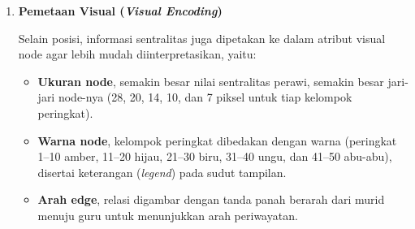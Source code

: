\begin{enumerate}
\begin{enumerate}
\item \textbf{Gaya tolak (\textit{repulsion})}, bekerja antar pasangan \textit{node} dan hanya diterapkan jika jarak antar \textit{node} kurang dari 320 piksel:
\begin{equation}
F_{tolak} = \frac{k_r}{d^2}, \quad k_r = 2000
\label{eq:gaya-tolak}
\end{equation}
dengan $d$ adalah jarak Euclidean antara dua \textit{node}.

\item \textbf{Gaya pegas (\textit{spring})}, bekerja pada setiap \textit{edge} dengan panjang ideal 200 piksel:
\begin{equation}
F_{pegas} = (d - L_0)\cdot k_s, \quad L_0 = 200,\ k_s = 0{,}003
\label{eq:gaya-pegas}
\end{equation}

\item \textbf{Gaya radial (\textit{radial constraint})}, menarik setiap \textit{node} menuju jari-jari cincin targetnya ($r_{target}$) sesuai peringkat sentralitas:
\begin{equation}
F_{radial} = (r - r_{target})\cdot k_c, \quad k_c = 0{,}014
\label{eq:gaya-radial}
\end{equation}
dengan $r$ adalah jarak \textit{node} saat ini dari titik pusat.
\end{enumerate}

Persamaan~\eqref{eq:gaya-tolak}, \eqref{eq:gaya-pegas}, dan \eqref{eq:gaya-radial} dijumlahkan pada setiap \textit{frame} untuk memperbarui kecepatan tiap \textit{node}, yang kemudian dikalikan dengan faktor peredam (\textit{damping}) sebesar 0,78. Posisi awal \textit{node} ditentukan berdasarkan peringkat sentralitasnya pada cincin konsentris dengan jari-jari 180 (peringkat 1--5), 320 (peringkat 6--15), 460 (peringkat 16--30), dan 600 (sisanya).

\item \textbf{Pemetaan Visual (\textit{Visual Encoding})}

Selain posisi, informasi sentralitas juga dipetakan ke dalam atribut visual node agar lebih mudah diinterpretasikan, yaitu:

\begin{itemize}
	\item \textbf{Ukuran node}, semakin besar nilai sentralitas perawi, semakin besar jari-jari node-nya (28, 20, 14, 10, dan 7 piksel untuk tiap kelompok peringkat).
	\item \textbf{Warna node}, kelompok peringkat dibedakan dengan warna (peringkat 1--10 amber, 11--20 hijau, 21--30 biru, 31--40 ungu, dan 41--50 abu-abu), disertai keterangan (\textit{legend}) pada sudut tampilan.
	\item \textbf{Arah edge}, relasi digambar dengan tanda panah berarah dari murid menuju guru untuk menunjukkan arah periwayatan.
\end{itemize}


\end{enumerate}
